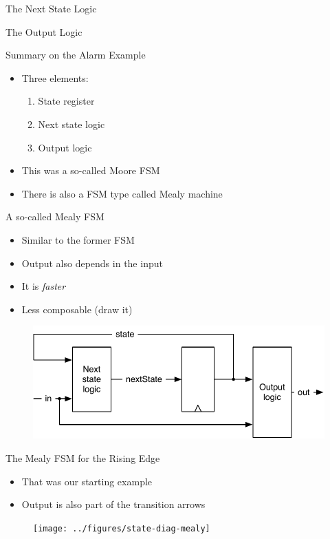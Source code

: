 \begin{frame}[fragile]{The Next State Logic}
\end{frame}

\begin{frame}[fragile]{The Output Logic}
\end{frame}

\begin{frame}[fragile]{Summary on the Alarm Example}
\begin{itemize}
\item Three elements:
\begin{enumerate}
\item State register
\item Next state logic
\item Output logic
\end{enumerate}
\item This was a so-called Moore FSM
\item There is also a FSM type called Mealy machine
\end{itemize}
\end{frame}

\begin{frame}[fragile]{A so-called Mealy FSM}
\begin{itemize}
\item Similar to the former FSM
\item Output also depends in the input
\item It is \emph{faster}
\item Less composable (draw it)
\end{itemize}
\begin{figure}
  \includegraphics[scale=\scale]{../figures/mealy}
\end{figure}
\end{frame}

\begin{frame}[fragile]{The Mealy FSM for the Rising Edge}
\begin{itemize}
\item That was our starting example
\item Output is also part of the transition arrows
\end{itemize}
\begin{figure}
  \texttt{[image: ../figures/state-diag-mealy]}
\end{figure}
\end{frame}

